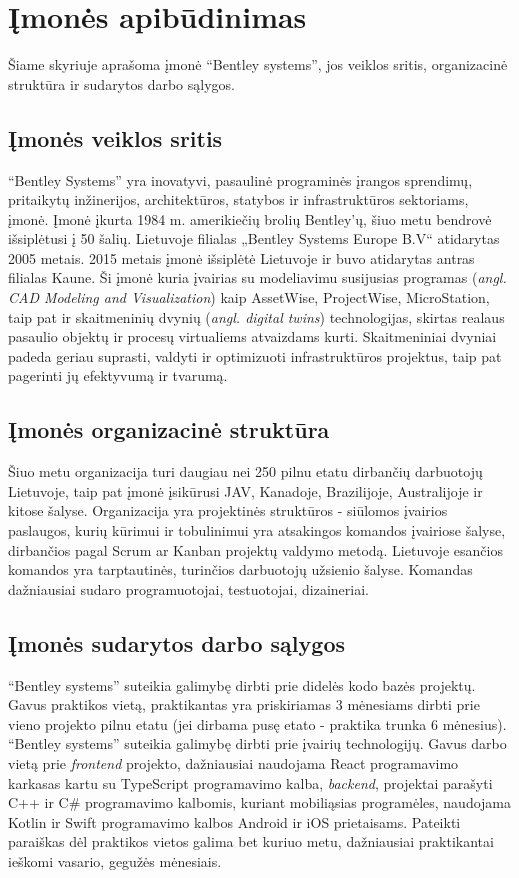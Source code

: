 
\section{Įmonės apibūdinimas}
Šiame skyriuje aprašoma įmonė \enquote{Bentley systems}, jos veiklos sritis, organizacinė struktūra ir sudarytos darbo sąlygos.
\subsection{Įmonės veiklos sritis}


\enquote{Bentley Systems} yra inovatyvi, pasaulinė programinės įrangos sprendimų, pritaikytų inžinerijos, architektūros, statybos ir infrastruktūros sektoriams, įmonė. Įmonė įkurta 1984 m. amerikiečių brolių Bentley'ų, šiuo metu bendrovė išsiplėtusi į 50 šalių. Lietuvoje filialas „Bentley Systems Europe B.V“ atidarytas 2005 metais. 2015 metais įmonė išsiplėtė Lietuvoje ir buvo atidarytas antras filialas Kaune. Ši įmonė kuria įvairias su modeliavimu susijusias programas (\emph{angl. CAD Modeling and Visualization}) kaip AssetWise, ProjectWise, MicroStation, taip pat ir skaitmeninių dvynių (\emph{angl. digital twins}) technologijas, skirtas realaus pasaulio objektų ir procesų virtualiems atvaizdams kurti. Skaitmeniniai dvyniai padeda geriau suprasti, valdyti ir optimizuoti infrastruktūros projektus, taip pat pagerinti jų efektyvumą ir tvarumą.

\subsection{Įmonės organizacinė struktūra}
Šiuo metu organizacija turi daugiau nei 250 pilnu etatu dirbančių darbuotojų Lietuvoje, taip pat įmonė įsikūrusi JAV, Kanadoje, Brazilijoje, Australijoje ir kitose šalyse. Organizacija yra projektinės struktūros - siūlomos įvairios paslaugos, kurių kūrimui ir tobulinimui yra atsakingos komandos įvairiose šalyse, dirbančios pagal Scrum ar Kanban projektų valdymo metodą. Lietuvoje esančios komandos yra tarptautinės, turinčios darbuotojų užsienio šalyse. Komandas dažniausiai sudaro programuotojai, testuotojai, dizaineriai.

\subsection{Įmonės sudarytos darbo sąlygos}
\enquote{Bentley systems} suteikia galimybę dirbti prie didelės kodo bazės projektų. Gavus praktikos vietą, praktikantas yra priskiriamas 3 mėnesiams dirbti prie vieno projekto pilnu etatu (jei dirbama pusę etato - praktika trunka 6 mėnesius). \enquote{Bentley systems} suteikia galimybę dirbti prie įvairių technologijų. Gavus darbo vietą prie \textit{frontend} projekto, dažniausiai naudojama React programavimo karkasas kartu su TypeScript programavimo kalba, \textit{backend}, projektai parašyti C++ ir C\# programavimo kalbomis, kuriant mobiliąsias programėles, naudojama Kotlin ir Swift programavimo kalbos Android ir iOS prietaisams. Pateikti paraiškas dėl praktikos vietos galima bet kuriuo metu, dažniausiai praktikantai ieškomi vasario, gegužės mėnesiais.

